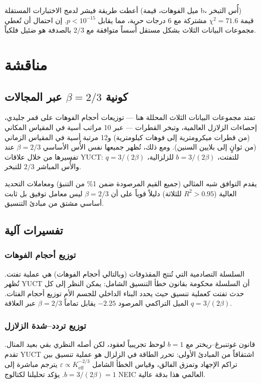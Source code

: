 \documentclass[11pt,a4paper]{article}
\newcommand{\eps}{\varepsilon}
\newcommand{\Keff}{K_{\mathrm{eff}}}
\newcommand{\betaf}{\beta}
\begin{document}
	أعطت طريقة فيشر لدمج الاختبارات المستقلة (ميل الفوهات، قيمة b، أُس التبخر) قيمة \(\chi^2 = 71.6\) مشتركة مع 6 درجات حرية، مما يقابل \(p < 10^{-15}\). إن احتمال أن تُعطي مجموعات البيانات الثلاث بشكل مستقل أُسساً متوافقة مع \(2/3\) بالصدفة هو ضئيل فلكياً.
	
	\section{مناقشة}
	
	\subsection{كونية \(\betaf = 2/3\) عبر المجالات}
	
	تمتد مجموعات البيانات الثلاث المحللة هنا — توزيعات أحجام الفوهات على قمر جليدي، إحصاءات الزلازل العالمية، وتبخر القطرات — عبر 10 مراتب أسية في المقياس المكاني (من قطرات ميكرومترية إلى فوهات كيلومترية) و12 مرتبة أسية في المقياس الزماني (من ثوانٍ إلى بلايين السنين). ومع ذلك، تُظهر جميعها نفس الأُس الأساسي \(\betaf = 2/3\) عند تفسيرها من خلال علاقات YUCT: \(q = 3/(2\betaf)\) للتفتت، \(b = 3/(2\betaf)\) للزلزالية، والأُس المباشر \(2/3\) للتبخر.
	
	يقدم التوافق شبه المثالي (جميع القيم المرصودة ضمن 1\% من التنبؤ) ومعاملات التحديد العالية (\(R^2 > 0.95\) للثلاثة) دليلاً قوياً على أن \(\betaf = 2/3\) ليس معامل توفيق بل ثابت أساسي مشتق من مبادئ التنسيق.
	
	\subsection{تفسيرات آلية}
	
	\subsubsection{توزيع أحجام الفوهات}
	السلسلة التصادمية التي تُنتج المقذوفات (وبالتالي أحجام الفوهات) هي عملية تفتت. تُظهر YUCT أن السلسلة محكومة بقانون خطأ التنسيق الشامل: يمكن النظر إلى كل حدث تفتت كعملية تنسيق حيث يحدد البناء الداخلي للجسم الأم توزيع أحجام الفتات. الميل التراكمي المرصود \(-2.25\) يقابل تماماً \(\betaf = 2/3\) عبر العلاقة \(q = 3/(2\betaf)\).
	
	\subsubsection{توزيع تردد–شدة الزلازل}
	قانون غوتنبرغ–ريختر مع \(b = 1\) لوحظ تجريبياً لعقود، لكن أصله النظري بقي بعيد المنال. تقدم YUCT اشتقاقاً من المبادئ الأولى: تحرر الطاقة في الزلزال هو عملية تنسيق بين تراكم الإجهاد وتمزق الفالق، وقياس الخطأ الشامل \(\eps \propto \Keff^{-2/3}\) يترجم مباشرة إلى \(b = 3/(2\betaf) = 1\). يؤكد تحليلنا لكتالوج NEIC العالمي هذا بدقة عالية.
	
\end{document}
